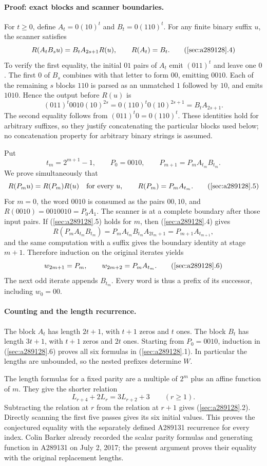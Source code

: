 \paragraph{Proof: exact blocks and scanner boundaries.}
For $t\ge0$, define $A_t=0(10)^t$ and $B_t=0(110)^t$. For any finite
binary suffix $u$, the scanner satisfies
\[
R(A_tB_su)=B_tA_{2s+1}R(u),\qquad R(A_t)=B_t.
\tag{\ref{sec:a289128}.4}
\]
To verify the first equality, the initial $01$ pairs of $A_t$ emit
$(011)^t$ and leave one $0$. The first $0$ of $B_s$ combines with
that letter to form $00$, emitting $0010$. Each of the remaining
$s$ blocks $110$ is parsed as an unmatched $1$ followed by $10$,
and emits $1010$. Hence the output before $R(u)$ is
\[
(011)^t0010(10)^{2s}=0(110)^t0(10)^{2s+1}=B_tA_{2s+1}.
\]
The second equality follows from
$(011)^t0=0(110)^t$. These identities hold for arbitrary suffixes,
so they justify concatenating the particular blocks used below;
no concatenation property for arbitrary binary strings is assumed.

Put
\[
t_m=2^{m+1}-1,\qquad P_0=0010,\qquad
P_{m+1}=P_mA_{t_m}B_{t_m}.
\]
We prove simultaneously that
\[
R(P_mu)=R(P_m)R(u)\quad\hbox{for every }u,
\qquad R(P_m)=P_mA_{t_m}.
\tag{\ref{sec:a289128}.5}
\]
For $m=0$, the word $0010$ is consumed as the pairs $00,10$, and
$R(0010)=0010010=P_0A_1$. The scanner is at a complete boundary
after those input pairs. If (\ref{sec:a289128}.5) holds for $m$,
then (\ref{sec:a289128}.4) gives
\[
R(P_mA_{t_m}B_{t_m})
=P_mA_{t_m}B_{t_m}A_{2t_m+1}
=P_{m+1}A_{t_{m+1}},
\]
and the same computation with a suffix gives the boundary identity
at stage $m+1$. Therefore induction on the original iterates yields
\[
w_{2m+1}=P_m,\qquad w_{2m+2}=P_mA_{t_m}.
\tag{\ref{sec:a289128}.6}
\]
The next odd iterate appends $B_{t_m}$. Every word is thus a prefix
of its successor, including $w_0=00$.

\paragraph{Counting and the length recurrence.}
The block $A_t$ has length $2t+1$, with $t+1$ zeros and $t$ ones.
The block $B_t$ has length $3t+1$, with $t+1$ zeros and $2t$ ones.
Starting from $P_0=0010$, induction in
(\ref{sec:a289128}.6) proves all six formulas in
(\ref{sec:a289128}.1). In particular the lengths are unbounded,
so the nested prefixes determine $W$.

The length formulas for a fixed parity are a multiple of $2^m$
plus an affine function of $m$. They give the shorter relation
\[
L_{r+4}+2L_r=3L_{r+2}+3\qquad(r\ge1).
\]
Subtracting the relation at $r$ from the relation at $r+1$ gives
(\ref{sec:a289128}.2). Directly scanning the first five passes
gives its six initial values. This proves the conjectured equality
with the separately defined A289131 recurrence for every index.
Colin Barker already recorded the scalar parity formulas and
generating function in A289131 on July 2, 2017; the present argument
proves their equality with the original replacement lengths.

